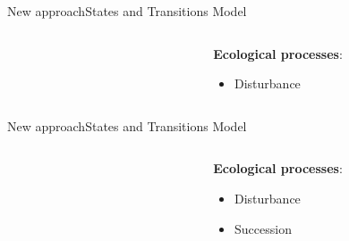 \documentclass[10pt,aspectratio=149]{beamer}
\begin{document}
\begin{frame}{New approach}{States and Transitions Model}


\begin{columns}[t]
	\begin{column}[t]{.40\paperwidth}
		\begin{figure}
			\small{}
		\end{figure}
	\end{column}
	\begin{column}[t]{.50\paperwidth}
	\textbf{Ecological processes}:
	\begin{itemize}
		\item Disturbance
	\end{itemize}
	\end{column}
\end{columns}

\end{frame}


\begin{frame}{New approach}{States and Transitions Model}


\begin{columns}[t]
	\begin{column}[t]{.40\paperwidth}
		\begin{figure}
			\small{}
		\end{figure}
	\end{column}
	\begin{column}[t]{.50\paperwidth}
	\textbf{Ecological processes}:
	\begin{itemize}
		\item Disturbance
		\item Succession
	\end{itemize}
	\end{column}
\end{columns}

\end{frame}

\end{document}
